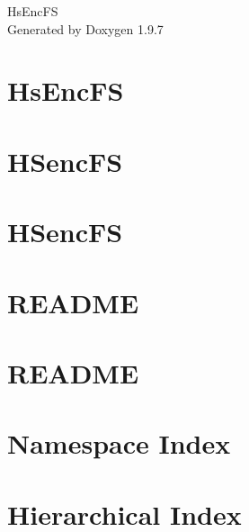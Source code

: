 \documentclass[twoside]{book}
\newcommand{\+}{\discretionary{\mbox{\scriptsize$\hookleftarrow$}}{}{}}
\newcommand{\clearemptydoublepage}{%
    \newpage{\pagestyle{empty}\cleardoublepage}%
  }
\begin{document}
  \raggedbottom
    \hypersetup{pageanchor=false,
                bookmarksnumbered=true,
                pdfencoding=unicode
               }
  \begin{titlepage}
  \vspace*{7cm}
  \begin{center}%
  {\Large Hs\+Enc\+FS}\\
  \vspace*{1cm}
  {\large Generated by Doxygen 1.9.7}\\
  \end{center}
  \end{titlepage}
  \clearemptydoublepage
  \tableofcontents
  \clearemptydoublepage
  \hypersetup{pageanchor=true}
\chapter{Hs\+Enc\+FS}
\label{index}\hypertarget{index}{}
\chapter{HSenc\+FS}
\label{md_doc_pak_README}

\chapter{HSenc\+FS}
\label{md_README}

\chapter{README}
\label{md_src_test_data_README}

\chapter{README}
\label{md_src_tests_README}

\chapter{Namespace Index}

\chapter{Hierarchical Index}

\end{document}
